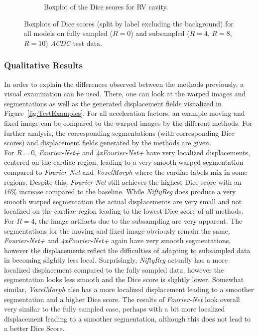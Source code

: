 \begin{figure}[H]
\begin{subfigure}{0.85\textwidth}
    		\caption{Boxplot of the Dice scores for RV cavity.} %
    		\label{fig:Boxplot_DiceScores_RV-Cavity}
	\end{subfigure}
	\caption{Boxplots of Dice scores (split by label excluding the background) for all models on fully sampled ($R=0$) and subsampled ($R=4$, $R=8$, $R=10$) \emph{ACDC} test data.}
	\label{fig:Boxplots_DiceScores}
\end{figure}


\subsubsection{Qualitative Results}
In order to explain the differences observed between the methods previously, a visual examination can be used. There, one can look at the warped images and segmentations as well as the generated displacement fields visualized in Figure~\ref{fig:TestExamples}. For all acceleration factors, an example moving and fixed image can be compared to the warped images by the different methods. For further analysis, the corresponding segmentations (with corresponding Dice scores) and displacement fields generated by the methods are given.\\
For $R=0$, \emph{Fourier-Net+} and \emph{4xFourier-Net+} have very localized displacements, centered on the cardiac region, leading to a very smooth warped segmentation compared to \emph{Fourier-Net} and \emph{VoxelMorph} where the cardiac labels mix in some regions. Despite this, \emph{Fourier-Net} still achieves the highest Dice score with an $16\%$ increase compared to the baseline. While \emph{NiftyReg} does produce a very smooth warped segmentation the actual displacements are very small and not localized on the cardiac region leading to the lowest Dice score of all methods.\\
For $R=4$, the image artifacts due to the subsampling are very apparent. The segmentations for the moving and fixed image obviously remain the same.
\emph{Fourier-Net+} and \emph{4xFourier-Net+} again have very smooth segmentations, however the displacements reflect the difficulties of adapting to subsampled data in becoming slightly less local. Surprisingly, \emph{NiftyReg} actually has a more localized displacement compared to the fully sampled data, however the segmentation looks less smooth and the Dice score is slightly lower. Somewhat similar, \emph{VoxelMorph} also has a more localized displacement leading to a smoother segmentation and a higher Dice score. The results of \emph{Fourier-Net} look overall very similar to the fully sampled case, perhaps with a bit more localized displacement leading to a smoother segmentation, although this does not lead to a better Dice Score.\\
